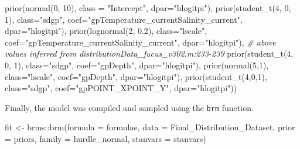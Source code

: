 \documentclass[
  12pt,
  oneside]{book}
\newenvironment{Shaded}{\begin{snugshade}}{\end{snugshade}}
\newcommand{\AttributeTok}[1]{\textcolor[rgb]{0.77,0.63,0.00}{#1}}
\newcommand{\CommentTok}[1]{\textcolor[rgb]{0.56,0.35,0.01}{\textit{#1}}}
\newcommand{\DecValTok}[1]{\textcolor[rgb]{0.00,0.00,0.81}{#1}}
\newcommand{\FloatTok}[1]{\textcolor[rgb]{0.00,0.00,0.81}{#1}}
\newcommand{\FunctionTok}[1]{\textcolor[rgb]{0.00,0.00,0.00}{#1}}
\newcommand{\NormalTok}[1]{#1}
\newcommand{\OtherTok}[1]{\textcolor[rgb]{0.56,0.35,0.01}{#1}}
\newcommand{\SpecialCharTok}[1]{\textcolor[rgb]{0.00,0.00,0.00}{#1}}
\newcommand{\StringTok}[1]{\textcolor[rgb]{0.31,0.60,0.02}{#1}}
\theoremstyle{definition}
\theoremstyle{definition}
\theoremstyle{definition}
\theoremstyle{remark}
\begin{document}
\begin{Shaded}
\begin{Highlighting}[]
  \FunctionTok{prior}\NormalTok{(}\FunctionTok{normal}\NormalTok{(}\DecValTok{0}\NormalTok{, }\DecValTok{10}\NormalTok{), }\AttributeTok{class =} \StringTok{"Intercept"}\NormalTok{, }\AttributeTok{dpar=}\StringTok{"hlogitpi"}\NormalTok{),}
  \FunctionTok{prior}\NormalTok{(}\FunctionTok{student\_t}\NormalTok{(}\DecValTok{4}\NormalTok{, }\DecValTok{0}\NormalTok{, }\DecValTok{1}\NormalTok{), }\AttributeTok{class=}\StringTok{"sdgp"}\NormalTok{, }
        \AttributeTok{coef=}\StringTok{"gpTemperature\_currentSalinity\_current"}\NormalTok{, }\AttributeTok{dpar=}\StringTok{"hlogitpi"}\NormalTok{),}
  \FunctionTok{prior}\NormalTok{(}\FunctionTok{lognormal}\NormalTok{(}\DecValTok{2}\NormalTok{, }\FloatTok{0.2}\NormalTok{), }\AttributeTok{class=}\StringTok{"lscale"}\NormalTok{, }
        \AttributeTok{coef=}\StringTok{"gpTemperature\_currentSalinity\_current"}\NormalTok{, }\AttributeTok{dpar=}\StringTok{"hlogitpi"}\NormalTok{), }
  \CommentTok{\# above values inferred from distributionData\_fucus\_v302.m:233{-}239}
  \FunctionTok{prior}\NormalTok{(}\FunctionTok{student\_t}\NormalTok{(}\DecValTok{4}\NormalTok{, }\DecValTok{0}\NormalTok{, }\DecValTok{1}\NormalTok{), }\AttributeTok{class=}\StringTok{"sdgp"}\NormalTok{, }\AttributeTok{coef=}\StringTok{"gpDepth"}\NormalTok{, }\AttributeTok{dpar=}\StringTok{"hlogitpi"}\NormalTok{),}
  \FunctionTok{prior}\NormalTok{(}\FunctionTok{normal}\NormalTok{(}\DecValTok{5}\NormalTok{,}\DecValTok{1}\NormalTok{), }\AttributeTok{class=}\StringTok{"lscale"}\NormalTok{, }\AttributeTok{coef=}\StringTok{"gpDepth"}\NormalTok{, }\AttributeTok{dpar=}\StringTok{"hlogitpi"}\NormalTok{),}
  \FunctionTok{prior}\NormalTok{(}\FunctionTok{student\_t}\NormalTok{(}\DecValTok{4}\NormalTok{,}\DecValTok{0}\NormalTok{,}\DecValTok{1}\NormalTok{), }\AttributeTok{class=}\StringTok{"sdgp"}\NormalTok{, }\AttributeTok{coef=}\StringTok{"gpPOINT\_XPOINT\_Y"}\NormalTok{, }
        \AttributeTok{dpar=}\StringTok{"hlogitpi"}\NormalTok{))}
\end{Highlighting}
\end{Shaded}

Finally, the model was compiled and sampled using the \texttt{brm} function.

\begin{Shaded}
\begin{Highlighting}[]
\NormalTok{fit }\OtherTok{\textless{}{-}}\NormalTok{ brms}\SpecialCharTok{::}\FunctionTok{brm}\NormalTok{(}\AttributeTok{formula =}\NormalTok{ formulae, }
                 \AttributeTok{data =}\NormalTok{ Final\_Distribution\_Dataset, }
                 \AttributeTok{prior =}\NormalTok{ priors,}
                 \AttributeTok{family =}\NormalTok{ hurdle\_normal, }
                 \AttributeTok{stanvars =}\NormalTok{ stanvars)}
\end{Highlighting}
\end{Shaded}
\end{document}
